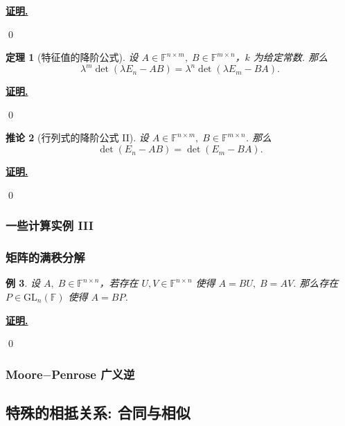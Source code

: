 \documentclass[10pt,openany]{article}
\theoremstyle{thmstyle} %
\newtheorem{theorem}{定理}[subsection]
\theoremstyle{defstyle} %
\newtheorem{corollary}[theorem]{推论}
\theoremstyle{prostyle} %
\theoremstyle{exastyle}
\newtheorem{example}[theorem]{例}
\theoremstyle{remstyle}
\renewenvironment{proof}[1][证明]{\par\underline{\textbf{#1.}} \;\fangsong}{\qed\par}
\newcommand{\F}{\mathbb{F}}
\newcommand{\gfn}{\text{GL}_n(\mathbb{F})}
\newcommand{\n}{^{n \times n}}
\newcommand{\mn}{^{m \times n}}
\newcommand{\nm}{^{n \times m}}
\begin{document}
\begin{proof}
	
\end{proof}

\begin{theorem}[特征值的降阶公式]
	设 \( A \in \F\nm, \; B \in \F\mn \)，\( k \) 为给定常数. 那么
	\[ \lambda^m \det(\lambda E_n - AB)= \lambda^{n} \det(\lambda E_m - BA). \]
\end{theorem}

\begin{proof}
	
\end{proof}

\begin{corollary}[行列式的降阶公式 II]
	设 \( A \in \F\nm, \; B \in \F\mn \). 那么
	\[ \det(E_n - AB)= \det(E_m - BA). \]
\end{corollary}

\begin{proof}
	
\end{proof}

\subsubsection{一些计算实例 III}



\subsubsection{矩阵的满秩分解} \label{2.4}

\begin{example} 
	设 \( A, \; B \in \F\n \)，若存在 \( U,V \in \F\n \) 使得 \( A=BU, \; B=AV \). 那么存在 \( P \in \gfn \) 使得 \( A=BP \).
\end{example}

\begin{proof}
	
\end{proof}

\subsubsection{Moore\(-\)Penrose 广义逆} \label{2.6}


\subsection{特殊的相抵关系: 合同与相似}
\end{document}
